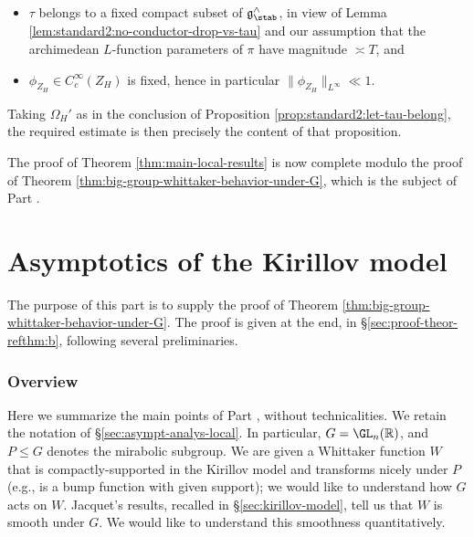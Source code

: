 \begin{enumerate}[(i)]
  \begin{itemize}
  \item $\tau$ belongs to a fixed compact subset of $\mathfrak{g}^\wedge_{\stab}$, in view of Lemma \ref{lem:standard2:no-conductor-drop-vs-tau} and our assumption that the archimedean $L$-function parameters of $\pi$ have magnitude $\asymp T$, and
  \item $\phi_{Z_H} \in C_c^\infty(Z_H)$ is fixed, hence in particular  $\|\phi_{Z_H}\|_{L^\infty} \ll 1$.
  \end{itemize}
  Taking $\Omega_H'$ as in the conclusion of Proposition \ref{prop:standard2:let-tau-belong}, the required estimate is then precisely the content of that proposition.
\end{enumerate}

The proof of Theorem  \ref{thm:main-local-results} is now complete modulo the proof of Theorem \ref{thm:big-group-whittaker-behavior-under-G}, which is the subject of Part \ref{part:asympt-analys-kirill}.


\part{Asymptotics of the Kirillov model}\label{part:asympt-analys-kirill}
The purpose of this part is to supply the proof of Theorem \ref{thm:big-group-whittaker-behavior-under-G}.  The proof is given at the end, in \S\ref{sec:proof-theor-refthm:b}, following several preliminaries.



\section{Overview}\label{sec:overview-asymp-kirillov}
Here we summarize the main points of Part \ref{part:asympt-analys-kirill}, without technicalities.  We retain the notation of \S\ref{sec:asympt-analys-local}.  In particular, $G = \GL_n(\mathbb{R})$, and $P \leq G$ denotes the mirabolic subgroup.  We are given a Whittaker function $W$ that is compactly-supported in the Kirillov model and transforms nicely under $P$ (e.g., is a bump function with given support); we would like to understand how $G$ acts on $W$.  Jacquet's results, recalled in \S\ref{sec:kirillov-model}, tell us that $W$ is smooth under $G$.  We would like to understand this smoothness quantitatively.


